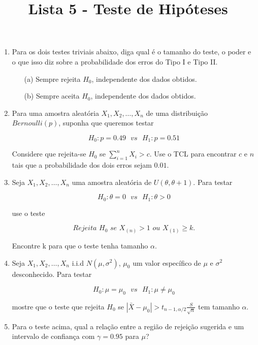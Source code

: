 \documentclass[12pt,a4paper]{article}
\title{Lista 5 - Teste de Hipóteses}
\date{}
\begin{document}
\maketitle

\begin{enumerate}[label=\textbf{\arabic*)}]

\item Para os dois testes triviais abaixo, diga qual é o tamanho do teste, o poder e o que isso diz sobre a probabilidade dos erros do Tipo I e Tipo II.

	\begin{itemize}
		\item[(a)] Sempre rejeita $H_0$, independente dos dados obtidos.
		\item[(b)] Sempre aceita $H_0$, independente dos dados obtidos.
	\end{itemize}

\item Para uma amostra aleatória $X_1,X_2,\dots,X_n$ de uma distribuição $Bernoulli(p)$, suponha que queremos testar

$$H_0: p=0.49 \, \, \, \, vs \, \, \, \, H_1: p=0.51$$

Considere que rejeita-se $H_0$ se $\sum_{i=1}^n X_i > c$. Use o TCL para encontrar $c$ e $n$ tais que a probabilidade dos dois erros sejam $0.01$.

\item Seja $X_1,X_2,\dots,X_n$ uma amostra aleatória de $U(\theta, \theta +1)$. Para testar 

$$H_0: \theta = 0 \, \, \, \, vs \, \, \, \, H_1: \theta > 0$$

use o teste 

$$Rejeita \, \, H_0 \, \,  se \, \,  X_{(n)} > 1 \, \, ou \, \, X_{(1)} \geq k.$$

Encontre k para que o teste tenha tamanho $\alpha$.

\item Seja $X_1,X_2,\dots,X_n$ i.i.d $N(\mu,\sigma^2)$, $\mu_0$ um valor específico de $\mu$ e $\sigma^2$ desconhecido. Para testar

$$H_0: \mu = \mu_0 \, \, \, \, vs \, \, \, \, H_1: \mu \neq \mu_0$$

mostre que o teste que rejeita $H_0$ se $|\bar{X}-\mu_0| > t_{n-1,\alpha/2}\frac{S}{\sqrt{n}}$ tem tamanho $\alpha$. 

\item Para o teste acima, qual a relação entre a região de rejeição sugerida e um intervalo de confiança com $\gamma = 0.95$ para $\mu$?


\end{enumerate}
\end{document}

